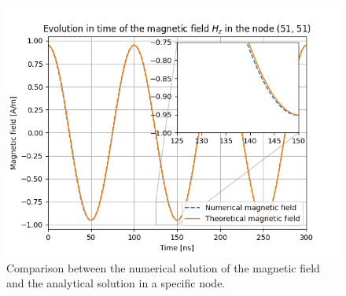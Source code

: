 \documentclass[12pt, oneside]{book}
\begin{document}
\begin{figure}[H]
    \centering
    \includegraphics[scale=0.8]{Imagenes/CFDTD2D_ResonantRectangularCavity_NodeEvolution_Comparison.png}
    \caption{Comparison between the numerical solution of the magnetic field and the analytical solution in a specific node.}
    \label{fig:CFDTD2D_RectangularResonantCavity_NodeEvolution}
\end{figure}

\begin{table}[H]
    \centering
    \caption{Comparison between the numerical and theoretical period of diverse modes of a square resonant cavity defined by the nodes $(10.5,10.5)$, $(95.5,10.5)$, $(95.5, 95.5)$ and $(10.5, 95.5)$ for the CFDTD method and $(11,11)$, $(96,11)$, $(96, 96)$ and $(11, 96)$ for the FDTD method, both using a Courant number equal to $0.4$.}
    \label{tab:PeriodComparison}
    \end{table}
\end{document}
